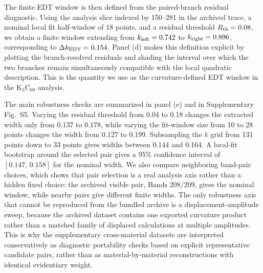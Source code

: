 The finite EDT window is then defined from the paired-branch residual diagnostic. Using the analysis slice indexed by 150--281 in the archived trace, a nominal local fit half-window of 18 points, and a residual threshold $R_{\rm th}=0.08$, we obtain a finite window extending from $k_{\rm left}=0.742$ to $k_{\rm right}=0.896$, corresponding to $\Delta k_{\rm EDT}=0.154$. Panel (d) makes this definition explicit by plotting the branch-resolved residuals and shading the interval over which the two branches remain simultaneously compatible with the local quadratic description. This is the quantity we use as the curvature-defined EDT window in the K$_3$C$_{60}$ analysis.

The main robustness checks are summarized in panel (e) and in Supplementary Fig.~S5. Varying the residual threshold from 0.04 to 0.18 changes the extracted width only from 0.137 to 0.178, while varying the fit-window size from 10 to 28 points changes the width from 0.127 to 0.199. Subsampling the $k$ grid from 131 points down to 33 points gives widths between 0.144 and 0.164. A local-fit bootstrap around the selected pair gives a 95\% confidence interval of $[0.147,\,0.158]$ for the nominal width. We also compare neighboring band-pair choices, which shows that pair selection is a real analysis axis rather than a hidden fixed choice: the archived visible pair, Bands 208/209, gives the nominal window, while nearby pairs give different finite widths. The only robustness axis that cannot be reproduced from the bundled archive is a displacement-amplitude sweep, because the archived dataset contains one exported curvature product rather than a matched family of displaced calculations at multiple amplitudes. This is why the supplementary cross-material datasets are interpreted conservatively as diagnostic portability checks based on explicit representative candidate pairs, rather than as material-by-material reconstructions with identical evidentiary weight.

